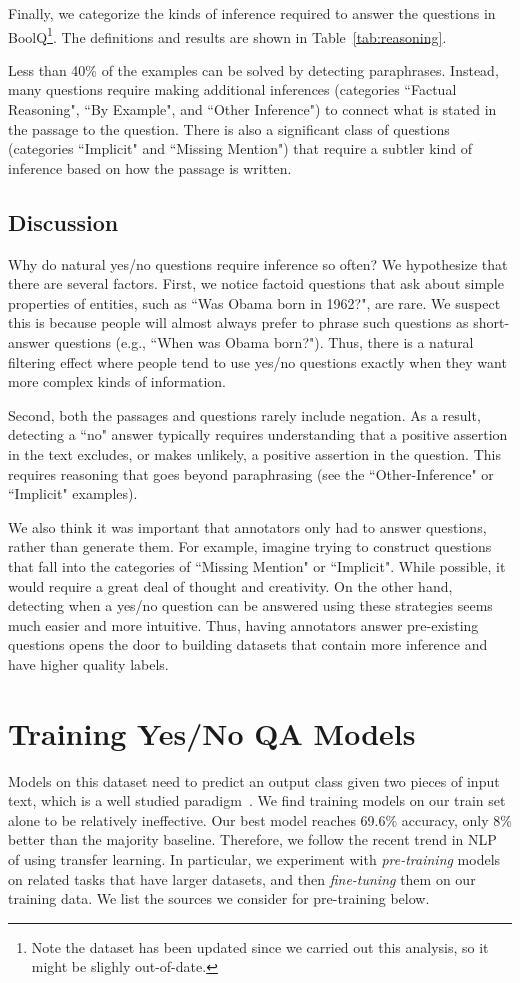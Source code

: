 Finally, we categorize the kinds of inference required to answer the questions in BoolQ\footnote{Note the dataset has been updated since we carried out this analysis, so it might be slighly out-of-date.}. The definitions and results are shown in Table~\ref{tab:reasoning}.

Less than 40\% of the examples can be solved by detecting paraphrases. Instead, many questions require making additional inferences (categories ``Factual Reasoning", ``By Example", and ``Other Inference") to connect what is stated in the passage to the question. There is also a significant class of questions (categories ``Implicit" and ``Missing Mention") that require a subtler kind of inference based on how the passage is written.

\subsection{Discussion}
Why do natural yes/no questions require inference so often? We hypothesize that there are several factors. First, we notice factoid questions that ask about simple properties of entities, such as ``Was Obama born in 1962?", are rare. We suspect this is because people will almost always prefer to phrase such questions as short-answer questions (e.g., ``When was Obama born?"). Thus, there is a natural filtering effect where people tend to use yes/no questions exactly when they want more complex kinds of information.

Second, both the passages and questions rarely include negation. As a result, detecting a ``no" answer typically requires understanding that a positive assertion in the text excludes, or makes unlikely, a positive assertion in the question. This requires reasoning that goes beyond paraphrasing (see the ``Other-Inference" or ``Implicit" examples).

We also think it was important that annotators only had to answer questions, rather than generate them. For example, imagine trying to construct questions that fall into the categories of ``Missing Mention" or ``Implicit". While possible, it would require a great deal of thought and creativity. On the other hand, detecting when a yes/no question can be answered using these strategies seems much easier and more intuitive. Thus, having annotators answer pre-existing questions opens the door to building datasets that contain more inference and have higher quality labels.

\section{Training Yes/No QA Models}
\label{sect:transfer}
Models on this dataset need to predict an output class given two pieces of input text, which is a well studied paradigm~\cite{glue}. We find training models on our train set alone to be relatively ineffective. Our best model reaches 69.6\% accuracy, only 8\% better than the majority baseline. Therefore, we follow the recent trend in NLP of using transfer learning. In particular, we experiment with {\em pre-training} models on related tasks that have larger datasets, and then {\em fine-tuning} them on our training data. We list the sources we consider for pre-training below.

